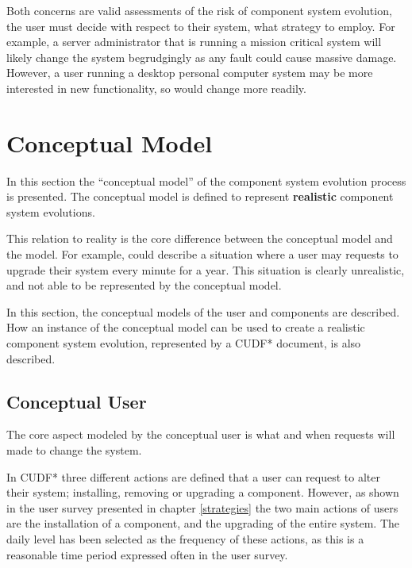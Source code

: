 Both concerns are valid assessments of the risk of component system evolution, the user must decide with respect to their system, what strategy to employ. 
For example, a server administrator that is running a mission critical system will likely change the system begrudgingly as any fault could cause massive damage.
However, a user running a desktop personal computer system may be more interested in new functionality, so would change more readily.

\section{Conceptual Model}
In this section the ``conceptual model'' of the component system evolution process is presented.
The conceptual model is defined to represent \textbf{realistic} component system evolutions.

This relation to reality is the core difference between the conceptual model and the \modelname model.
For example, \modelname could describe a situation where a user may requests to upgrade their system every minute for a year.
This situation is clearly unrealistic, and not able to be represented by the conceptual model.

In this section, the conceptual models of the user and components are described.
How an instance of the conceptual model can be used to create a realistic component system evolution, represented by a CUDF* document, is also described.

\subsection{Conceptual User}
The core aspect modeled by the conceptual user is what and when requests will made to change the system. 

In CUDF* three different actions are defined that a user can request to alter their system; installing, removing or upgrading a component.
However, as shown in the user survey presented in chapter \ref{strategies} the two main actions of users are the installation of a component, and the upgrading of the entire system.
The daily level has been selected as the frequency of these actions, as this is a reasonable time period expressed often in the user survey. 

